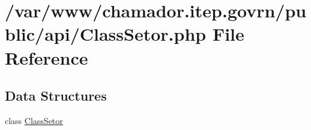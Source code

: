 \hypertarget{_class_setor_8php}{}\section{/var/www/chamador.itep.\+govrn/public/api/\+Class\+Setor.php File Reference}
\label{_class_setor_8php}
\subsection*{Data Structures}
\begin{DoxyCompactItemize}
\item 
class \hyperlink{class_class_setor}{Class\+Setor}
\end{DoxyCompactItemize}
